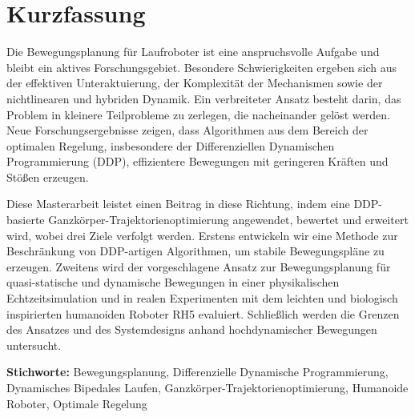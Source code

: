 \thispagestyle{empty}
\chapter*{Kurzfassung}

Die Bewegungsplanung f{\"u}r Laufroboter ist eine anspruchsvolle Aufgabe und bleibt ein aktives Forschungsgebiet. Besondere Schwierigkeiten ergeben sich aus der effektiven Unteraktuierung, der Komplexit{\"a}t der Mechanismen sowie der nichtlinearen und hybriden Dynamik. Ein verbreiteter Ansatz besteht darin, das Problem in kleinere Teilprobleme zu zerlegen, die nacheinander gel{\"o}st werden. Neue Forschungsergebnisse zeigen, dass Algorithmen aus dem Bereich der optimalen Regelung, insbesondere der Differenziellen Dynamischen Programmierung (DDP), effizientere Bewegungen mit geringeren Kr{\"a}ften und St{\"o}{\ss}en erzeugen.

Diese Masterarbeit leistet einen Beitrag in diese Richtung, indem eine DDP-basierte Ganzk{\"o}rper-Trajektorienoptimierung angewendet, bewertet und erweitert wird, wobei drei Ziele verfolgt werden. Erstens entwickeln wir eine Methode zur Beschr{\"a}nkung von DDP-artigen Algorithmen, um stabile Bewegungspl{\"a}ne zu erzeugen. Zweitens wird der vorgeschlagene Ansatz zur Bewegungsplanung f{\"u}r quasi-statische und dynamische Bewegungen in einer physikalischen Echtzeitsimulation und in realen Experimenten mit dem leichten und biologisch inspirierten humanoiden Roboter RH5 evaluiert. Schlie{\ss}lich werden die Grenzen des Ansatzes und des Systemdesigns anhand hochdynamischer Bewegungen untersucht.

\vfill
\noindent\textbf{Stichworte:} Bewegungsplanung, Differenzielle Dynamische Programmierung, Dynamisches Bipedales Laufen, Ganzk{\"o}rper-Trajektorienoptimierung, Humanoide Roboter, Optimale Regelung
